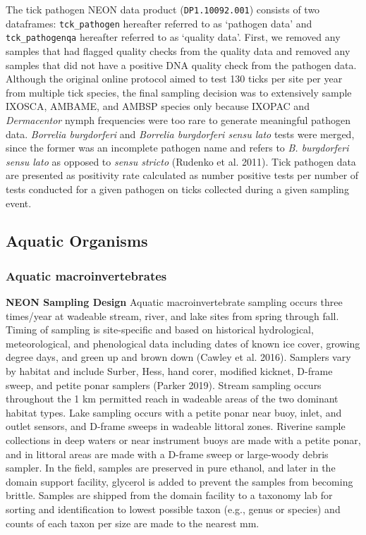 \documentclass[
  12pt,
]{article}
\begin{document}
The tick pathogen NEON data product (\texttt{DP1.10092.001}) consists of two dataframes: \texttt{tck\_pathogen} hereafter referred to as `pathogen data' and \texttt{tck\_pathogenqa} hereafter referred to as `quality data'. First, we removed any samples that had flagged quality checks from the quality data and removed any samples that did not have a positive DNA quality check from the pathogen data. Although the original online protocol aimed to test 130 ticks per site per year from multiple tick species, the final sampling decision was to extensively sample IXOSCA, AMBAME, and AMBSP species only because IXOPAC and \emph{Dermacentor} nymph frequencies were too rare to generate meaningful pathogen data. \emph{Borrelia burgdorferi} and \emph{Borrelia burgdorferi sensu lato} tests were merged, since the former was an incomplete pathogen name and refers to \emph{B. burgdorferi sensu lato} as opposed to \emph{sensu stricto} (Rudenko et al. 2011). Tick pathogen data are presented as positivity rate calculated as number positive tests per number of tests conducted for a given pathogen on ticks collected during a given sampling event.

\hypertarget{aquatic-organisms}{%
\subsection{Aquatic Organisms}\label{aquatic-organisms}}

\hypertarget{aquatic-macroinvertebrates}{%
\subsubsection{Aquatic macroinvertebrates}\label{aquatic-macroinvertebrates}}

\textbf{NEON Sampling Design} Aquatic macroinvertebrate sampling occurs three times/year at wadeable stream, river, and lake sites from spring through fall. Timing of sampling is site-specific and based on historical hydrological, meteorological, and phenological data including dates of known ice cover, growing degree days, and green up and brown down (Cawley et al. 2016). Samplers vary by habitat and include Surber, Hess, hand corer, modified kicknet, D-frame sweep, and petite ponar samplers (Parker 2019). Stream sampling occurs throughout the 1 km permitted reach in wadeable areas of the two dominant habitat types. Lake sampling occurs with a petite ponar near buoy, inlet, and outlet sensors, and D-frame sweeps in wadeable littoral zones. Riverine sample collections in deep waters or near instrument buoys are made with a petite ponar, and in littoral areas are made with a D-frame sweep or large-woody debris sampler. In the field, samples are preserved in pure ethanol, and later in the domain support facility, glycerol is added to prevent the samples from becoming brittle. Samples are shipped from the domain facility to a taxonomy lab for sorting and identification to lowest possible taxon (e.g., genus or species) and counts of each taxon per size are made to the nearest mm.
\end{document}
